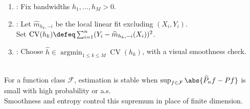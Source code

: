 \begin{method} \label{meth:local-linear-bandwidth-cross-validation} 
\begin{enumerate}[label=(\roman*)]
\setlength{\itemsep}{0pt}
\item {}: Fix bandwidths $h_1,\ldots,h_M>0$.
\item {}: Let $\widehat{m}_{h_k,-i}$ be the local linear fit excluding $(X_i,Y_i)$.\\
Set $\operatorname{CV}(h_k)\defeq\sum_{i=1}^n(Y_i-\widehat{m}_{h_k,-i}(X_i))^2$.
\item {}: Choose $\widehat{h}\in\operatorname*{argmin}_{1\leq k\leq M}\operatorname{CV}(h_k)$, with a visual smoothness check.
\end{enumerate}
\end{method}

\begin{remark} \label{rem:complexity-controls-nonparametric-estimation} \\
For a function class $\mathcal{F}$, estimation is stable when $\sup_{f\in\mathcal{F}}\abs{\widehat{P}_nf-Pf}$ is small with high probability or a.s.\\
Smoothness and entropy control this supremum in place of finite dimension.
\end{remark}
